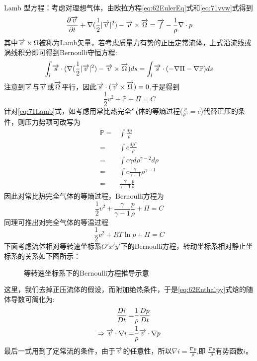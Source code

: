 Lamb 型方程：考虑对理想气体，由欧拉方程\eqref{eq:62EulerEq}式和\eqref{eq:71vvw}式得到
\begin{equation}\label{eq:71Lamb}
 \frac{\partial \overrightarrow{v}}{\partial t}+\nabla(\frac{1}{2}|\overrightarrow{v}|^2)-\overrightarrow{v}\times \overrightarrow{\Omega}=\overrightarrow{f}-\frac{1}{\rho}\nabla\cdot p
\end{equation}
其中$\overrightarrow{v}\times \Omega$被称为Lamb矢量，若考虑质量力有势的正压定常流体，上式沿流线或涡线积分即可得到Bernoulli守恒方程:
\begin{equation}
\int_l \overrightarrow{s}\cdot (\nabla(\frac{1}{2}|\overrightarrow{v}|^2)-\overrightarrow{v}\times \overrightarrow{\Omega})ds=\int_l \overrightarrow{s}\cdot (-\nabla\Pi-\nabla \mathbb{P})ds
\end{equation}
注意到$\overrightarrow{s}$与$\overrightarrow{v}$或$\overrightarrow{\Omega}$平行，因此$\overrightarrow{s}\cdot(\overrightarrow{v}\times \overrightarrow{\Omega})=0$,于是得到
\begin{equation}\label{eq:71LambBernoulli}
\frac{1}{2}v^2+\mathbb{P}+\Pi=C
\end{equation}
针对\eqref{eq:71Lamb}式，如考虑用常比热完全气体的等熵过程($\frac{p}{\rho^{\gamma}}=c$)代替正压的条件，则压力势项可改写为
\begin{align*}
\mathbb{P}=&\int \frac{dp}{\rho}\\
=& \int c\frac{d\rho^{\gamma}}{\rho}\\
=& \int c \gamma d \rho^{\gamma-2} d\rho\\
=& \int c \frac{\gamma}{\gamma-1} \rho^{\gamma-1}\\
=& \frac{\gamma}{\gamma-1}\frac{p}{\rho}
\end{align*}
因此对常比热完全气体的等熵过程，Bernoulli方程为
\begin{equation}
\frac{1}{2}v^2+\frac{\gamma}{\gamma-1}\frac{p}{\rho}+\Pi=C
\end{equation}
同理可推出对完全气体的等温过程
\begin{equation}
\frac{1}{2}v^2+RT\ln p+\Pi=C
\end{equation}
下面考虑流体相对等转速坐标系$O'x'y'$下的Bernoulli方程，转动坐标系相对静止坐标系的关系如下图所示：
\begin{figure}[!ht]
 \centering
 
 \caption{等转速坐标系下的Bernoulli方程推导示意}\label{fig:71rotationalCoordinateBernoulli}
\end{figure}
这里，我们去掉正压流体的假设，而附加绝热条件，于是\eqref{eq:62Enthalpy}式焓的随体导数可简化为:
\begin{align*}
\frac{D i}{D t} = &\frac{1}{\rho} \frac{D p}{D t}\\
\Rightarrow  \overrightarrow{v}\cdot \nabla i =& \frac{1}{\rho} \overrightarrow{v}\cdot \nabla p
\end{align*}
最后一式用到了定常流的条件，由于$\overrightarrow{v}$的任意性，所以$\nabla i = \frac{\nabla p}{\rho}$,即
$\frac{\nabla p}{\rho}$有势函数$i$。

